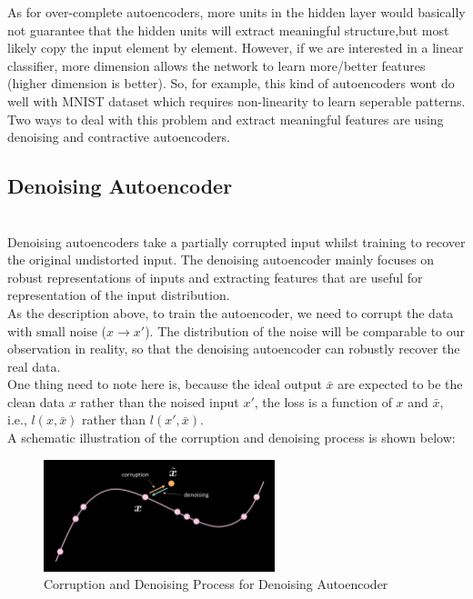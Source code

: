 As for over-complete autoencoders, more units in the hidden layer would basically not guarantee that the hidden units will extract meaningful structure,but most likely copy the input element by element. However, if we are interested in a linear classifier, more dimension allows the network to learn more/better features (higher dimension is better). So, for example, this kind of autoencoders wont do well with MNIST dataset which requires non-linearity to learn seperable patterns. Two ways to deal with this problem and extract meaningful features are using denoising and contractive autoencoders.
\\
\subsection{Denoising Autoencoder}
\\
Denoising autoencoders take a partially corrupted input whilst training to recover the original undistorted input. The denoising autoencoder mainly focuses on robust representations of inputs and extracting features that are useful for representation of the input distribution.
\\
As the description above, to train the autoencoder, we need to corrupt the data with small noise ($x \rightarrow x'$). The distribution of the noise will be comparable to our observation in reality, so that the denoising autoencoder can robustly recover the real data.
\\One thing need to note here is, because the ideal output $\bar{x}$ are expected to be the clean data $x$ rather than the noised input $x'$, the loss is a function of $x$ and $\bar{x}$, i.e., $l(x,\bar{x})$ rather than $l(x',\bar{x})$.
\\
A schematic illustration of the corruption and denoising process is shown below:
\\
\begin{figure}[htb]
    \centering
    \includegraphics[width=0.6\textwidth]{labs/09/images/Corrpution_and_Denoising.png}
    \caption{Corruption and Denoising Process for Denoising Autoencoder}
    \label{fig:Corrpution_and_Denoising}
\end{figure}

